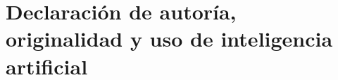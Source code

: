 \chapter*{Declaración de autoría, originalidad y uso de inteligencia artificial}
\label{declaracion-autoria}


